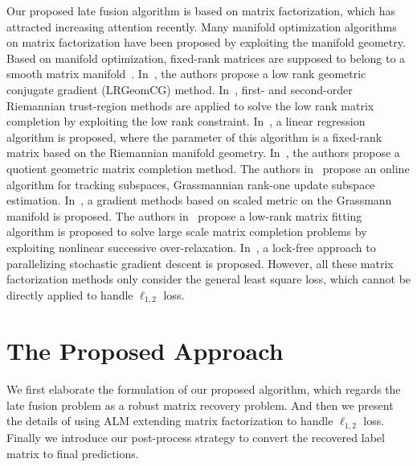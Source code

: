 \documentclass[letterpaper]{article}
\begin{document}
Our proposed late fusion algorithm is based on matrix factorization,
which has attracted increasing attention recently.
Many manifold optimization algorithms on matrix factorization have been proposed by exploiting the manifold geometry.
Based on manifold optimization, fixed-rank matrices are supposed to belong to a smooth matrix manifold~\cite{Absil2008OAMM,vandereycken2013lowrank}.
In~\cite{vandereycken2013lowrank}, the authors propose a low rank geometric conjugate gradient (LRGeomCG) method.
In~\cite{rtrmc2011boumal}, first- and second-order Riemannian trust-region methods are applied to solve the low rank matrix completion by exploiting the low rank constraint.
In~\cite{Bonnabel2011}, a linear regression algorithm is proposed, where the parameter of this algorithm is a fixed-rank matrix based on the Riemannian manifold geometry.
In~\cite{Mishra2012}, the authors propose a quotient geometric matrix completion method.
The authors in~\cite{grouse2010Balzano} propose an online algorithm for tracking subspaces, Grassmannian rank-one update subspace estimation.
In~\cite{ngonips2012scaled}, a gradient methods based on scaled metric on the Grassmann manifold is proposed.
The authors in~\cite{Wen2012} propose a low-rank matrix fitting algorithm is proposed to solve large scale matrix completion problems by exploiting nonlinear successive over-relaxation.
In~\cite{RechtNIPS2011hogwild}, a lock-free approach to parallelizing stochastic gradient descent is proposed.
However, all these matrix factorization methods only consider the general least square loss, which cannot be directly applied to handle $\ell_{1,2}$ loss.




\section{The Proposed Approach}

We first elaborate the formulation of our proposed algorithm,
which regards the late fusion problem as a robust matrix recovery problem.
And then we present the details of using ALM extending matrix factorization to handle $\ell_{1,2}$ loss.
Finally we introduce our post-process strategy to convert the recovered label matrix to final predictions.
\end{document}
